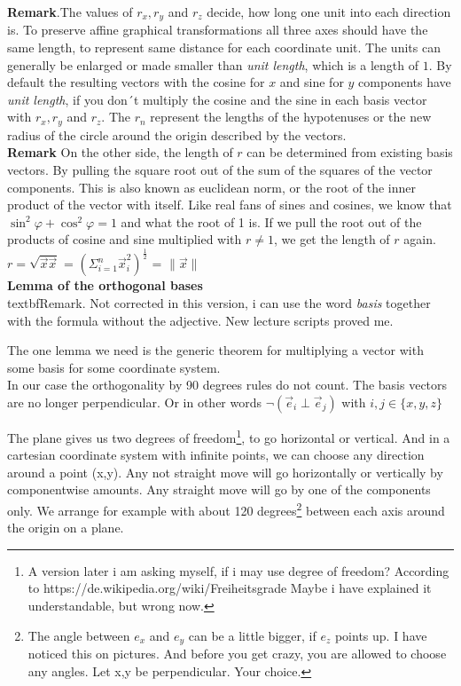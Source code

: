\documentclass[a4paper]{article}
\begin{document}
\textbf{Remark}.The values of $r_x, r_y$ and $r_z$ decide, how long one unit into each
direction is. To preserve affine graphical transformations all three
axes should have the same length, to represent same distance for each coordinate unit. 
The units can generally be enlarged or made smaller than \emph{unit length}, which is a length of $1$. 
By default the resulting vectors with the cosine for $x$ and sine for $y$ components have \emph{unit length}, 
if you don´t multiply the cosine and the sine in each basis vector with $r_x, r_y$ and $r_z$. The $r_n$ represent the lengths of the hypotenuses or the new radius of the circle around the origin described by the vectors. \\

\textbf{Remark} On the other side, the length of $r$ can be determined from existing basis vectors.
By pulling the square root out of the sum of the squares of the vector components.
This is also known as euclidean norm, or the root of the inner product of the vector with itself.
Like real fans of sines and cosines, we know that $\sin^2 \varphi + \cos^2 \varphi = 1$ and what the root of 1 is.
If we pull the root out of the products of cosine and sine multiplied with $r \ne 1$, we get the length of $r$ again. 
$r = \sqrt{\vec{x}\vec{x}}$ = $\left(\Sigma_{i=1}^{n} \vec{x}_i^2\right)^{\frac{1}{2}}$ = $\|\vec{x}\|$\\

\textbf{Lemma of the orthogonal bases}\\

textbf{Remark.} Not corrected in this version, i can use the word \emph{basis} together with the formula without the adjective. New lecture scripts proved me.

The one lemma we need is the generic theorem for multiplying a vector with some basis for some coordinate system.\\

In our case the orthogonality by 90 degrees rules do not count. The basis vectors are no longer perpendicular. Or in other words
$\neg \left( \vec{e}_i \perp \vec{e}_j \right)$ with $i,j \in \{x,y,z\}$

The plane gives us two degrees of freedom\footnote{A version later i am asking myself, if i may use degree of freedom? According to https://de.wikipedia.org/wiki/Freiheitsgrade Maybe i have explained it understandable, but wrong now.}, to go horizontal or vertical. And in a cartesian coordinate system with infinite points, we can choose any direction around a point (x,y).
Any not straight move will go horizontally or vertically by componentwise amounts. Any straight move will go by one of the components only.
We arrange for example with about 120 degrees\footnote{The angle between $e_x$ and $e_y$ can be a little bigger, if $e_z$ points up. I have noticed this on pictures. And before you get crazy, you are allowed to choose any angles. Let x,y be perpendicular. Your choice.} between each axis around the origin on a plane. \\
\end{document}

